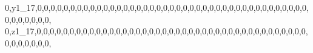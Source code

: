\documentclass[]{article}
\newenvironment{Shaded}{\begin{snugshade}}{\end{snugshade}}
\newcommand{\DecValTok}[1]{\textcolor[rgb]{0.00,0.00,0.81}{#1}}
\newcommand{\NormalTok}[1]{#1}
\begin{document}
\begin{Shaded}
\begin{Highlighting}[]
\DecValTok{0}\NormalTok{,y1_}\DecValTok{17}\NormalTok{,}\DecValTok{0}\NormalTok{,}\DecValTok{0}\NormalTok{,}\DecValTok{0}\NormalTok{,}\DecValTok{0}\NormalTok{,}\DecValTok{0}\NormalTok{,}\DecValTok{0}\NormalTok{,}\DecValTok{0}\NormalTok{,}\DecValTok{0}\NormalTok{,}\DecValTok{0}\NormalTok{,}\DecValTok{0}\NormalTok{,}\DecValTok{0}\NormalTok{,}\DecValTok{0}\NormalTok{,}\DecValTok{0}\NormalTok{,}\DecValTok{0}\NormalTok{,}\DecValTok{0}\NormalTok{,}\DecValTok{0}\NormalTok{,}\DecValTok{0}\NormalTok{,}\DecValTok{0}\NormalTok{,}\DecValTok{0}\NormalTok{,}\DecValTok{0}\NormalTok{,}\DecValTok{0}\NormalTok{,}\DecValTok{0}\NormalTok{,}\DecValTok{0}\NormalTok{,}\DecValTok{0}\NormalTok{,}\DecValTok{0}\NormalTok{,}\DecValTok{0}\NormalTok{,}\DecValTok{0}\NormalTok{,}\DecValTok{0}\NormalTok{,}\DecValTok{0}\NormalTok{,}\DecValTok{0}\NormalTok{,}\DecValTok{0}\NormalTok{,}\DecValTok{0}\NormalTok{,}\DecValTok{0}\NormalTok{,}\DecValTok{0}\NormalTok{,}\DecValTok{0}\NormalTok{,}\DecValTok{0}\NormalTok{,}\DecValTok{0}\NormalTok{,}\DecValTok{0}\NormalTok{,}\DecValTok{0}\NormalTok{,}\DecValTok{0}\NormalTok{,}\DecValTok{0}\NormalTok{,}\DecValTok{0}\NormalTok{,}\DecValTok{0}\NormalTok{,}\DecValTok{0}\NormalTok{,}\DecValTok{0}\NormalTok{,}\DecValTok{0}\NormalTok{,}\DecValTok{0}\NormalTok{,}\DecValTok{0}\NormalTok{,}
\DecValTok{0}\NormalTok{,z1_}\DecValTok{17}\NormalTok{,}\DecValTok{0}\NormalTok{,}\DecValTok{0}\NormalTok{,}\DecValTok{0}\NormalTok{,}\DecValTok{0}\NormalTok{,}\DecValTok{0}\NormalTok{,}\DecValTok{0}\NormalTok{,}\DecValTok{0}\NormalTok{,}\DecValTok{0}\NormalTok{,}\DecValTok{0}\NormalTok{,}\DecValTok{0}\NormalTok{,}\DecValTok{0}\NormalTok{,}\DecValTok{0}\NormalTok{,}\DecValTok{0}\NormalTok{,}\DecValTok{0}\NormalTok{,}\DecValTok{0}\NormalTok{,}\DecValTok{0}\NormalTok{,}\DecValTok{0}\NormalTok{,}\DecValTok{0}\NormalTok{,}\DecValTok{0}\NormalTok{,}\DecValTok{0}\NormalTok{,}\DecValTok{0}\NormalTok{,}\DecValTok{0}\NormalTok{,}\DecValTok{0}\NormalTok{,}\DecValTok{0}\NormalTok{,}\DecValTok{0}\NormalTok{,}\DecValTok{0}\NormalTok{,}\DecValTok{0}\NormalTok{,}\DecValTok{0}\NormalTok{,}\DecValTok{0}\NormalTok{,}\DecValTok{0}\NormalTok{,}\DecValTok{0}\NormalTok{,}\DecValTok{0}\NormalTok{,}\DecValTok{0}\NormalTok{,}\DecValTok{0}\NormalTok{,}\DecValTok{0}\NormalTok{,}\DecValTok{0}\NormalTok{,}\DecValTok{0}\NormalTok{,}\DecValTok{0}\NormalTok{,}\DecValTok{0}\NormalTok{,}\DecValTok{0}\NormalTok{,}\DecValTok{0}\NormalTok{,}\DecValTok{0}\NormalTok{,}\DecValTok{0}\NormalTok{,}\DecValTok{0}\NormalTok{,}\DecValTok{0}\NormalTok{,}\DecValTok{0}\NormalTok{,}\DecValTok{0}\NormalTok{,}\DecValTok{0}\NormalTok{,}

\end{Highlighting}
\end{Shaded}
\end{document}
